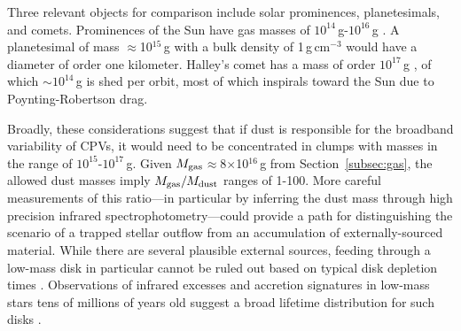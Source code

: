 \documentclass{nature3}
\begin{document}
\begin{methods}
Three relevant objects for comparison include solar
prominences, planetesimals, and comets.  Prominences of the Sun have
gas masses of $10^{14}$\,g-$10^{16}$\,g \cite{VialEngvold2015}.
A planetesimal of mass $\approx$10$^{15}$\,g with a bulk density of
1\,g\,cm$^{-3}$ would have a diameter of order one kilometer.
Halley's comet has a mass of order $10^{17}$\,g \cite{Rickman1989}, of
which $\sim$$10^{14}$\,g is shed per orbit, most of which inspirals
toward the Sun due to Poynting-Robertson drag.

Broadly, these considerations suggest that if dust is responsible for
the broadband variability of CPVs, it would need to be concentrated in
clumps with masses in the range of $10^{15}$-$10^{17}$\,g.  Given
$M_{\rm gas}$$\approx$8$\times$10$^{16}$\,g from
Section~\ref{subsec:gas}, the allowed dust masses imply $M_{\rm
gas}/M_{\rm dust}$ ranges of 1-100.  More careful measurements of this
ratio---in particular by inferring the dust mass through high
precision infrared spectrophotometry---could provide a path for
distinguishing the scenario of a trapped stellar outflow from an
accumulation of externally-sourced material.  While there are several
plausible external sources, feeding through a low-mass disk in
particular cannot be ruled out based on typical disk depletion times
\cite{Haisch2001}.  Observations of infrared excesses and accretion
signatures in low-mass stars tens of millions of years old suggest a
broad lifetime distribution for such disks
\cite{Silverberg2020,Lee2020,Gaidos2022,Pfalzner2024}.




\end{methods}
\end{document}
